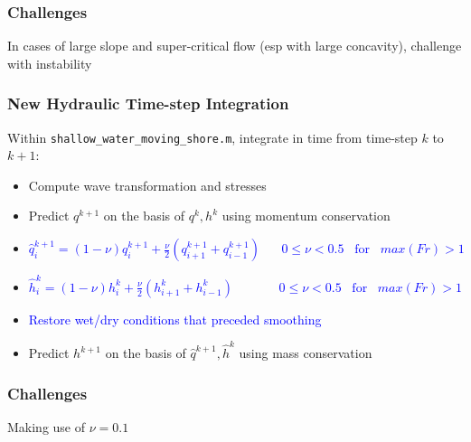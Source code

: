 \documentclass[aspectratio=169]{beamer}
\begin{document}
\begin{frame}
  \frametitle{Challenges}
  In cases of large slope and super-critical flow (esp with large concavity), challenge with instability  
  \centering
\end{frame}
\begin{frame}[fragile]
  \frametitle{New Hydraulic Time-step Integration}
  Within \texttt{shallow\_water\_moving\_shore.m}, integrate in time from time-step $k$ to $k+1$:
   \begin{itemize}
   \item Compute wave transformation and stresses
   \item Predict $q^{k+1}$ on the basis of $q^{k},h^k$ using momentum conservation
   \item \textcolor{blue}{$\hat{q}_i^{k+1} = (1-\nu) q_i^{k+1} + \frac{\nu}{2}(q_{i+1}^{k+1} + q_{i-1}^{k+1})
     \;\;\;\;\;\; 0\leq \nu <0.5 \;\;\;  \mbox{for} \;\;\; max(Fr)>1$}
   \item \textcolor{blue}{$\hat{h}_i^{k} = (1-\nu) h_i^{k} + \frac{\nu}{2}(h_{i+1}^{k} + h_{i-1}^{k}) 
     \;\;\;\;\;\;\;\;\;\;\;\;\; 0\leq \nu <0.5 \;\;\;  \mbox{for} \;\;\; max(Fr)>1$}
   \item \textcolor{blue}{Restore wet/dry conditions that preceded smoothing}
   \item Predict $h^{k+1}$ on the basis of $\hat{q}^{k+1},\hat{h}^k$ using mass conservation
   \end{itemize}
\end{frame}
\begin{frame}
  \frametitle{Challenges}
  Making use of $\nu = 0.1$
  \centering
\end{frame}
\end{document}

